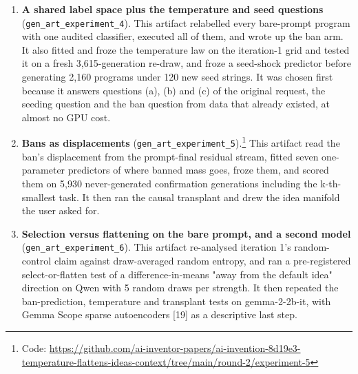 \documentclass[11pt,letterpaper]{article}
\begin{document}
\begin{enumerate}
\item \textbf{A shared label space plus the temperature and seed questions} (\texttt{gen\_\allowbreak{}art\_\allowbreak{}experiment\_\allowbreak{}4}). This artifact relabelled every bare-prompt program with one audited classifier, executed all of them, and wrote up the ban arm. It also fitted and froze the temperature law on the iteration-1 grid and tested it on a fresh 3,615-generation re-draw, and froze a seed-shock predictor before generating 2,160 programs under 120 new seed strings. It was chosen first because it answers questions (a), (b) and (c) of the original request, the seeding question and the ban question from data that already existed, at almost no GPU cost.
\item \textbf{Bans as displacements} (\texttt{gen\_\allowbreak{}art\_\allowbreak{}experiment\_\allowbreak{}5}).\footnote{Code: \url{https://github.com/ai-inventor-papers/ai-invention-8d19e3-temperature-flattens-ideas-context/tree/main/round-2/experiment-5}} This artifact read the ban's displacement from the prompt-final residual stream, fitted seven one-parameter predictors of where banned mass goes, froze them, and scored them on 5,930 never-generated confirmation generations including the k-th-smallest task. It then ran the causal transplant and drew the idea manifold the user asked for.
\item \textbf{Selection versus flattening on the bare prompt, and a second model} (\texttt{gen\_\allowbreak{}art\_\allowbreak{}experiment\_\allowbreak{}6}). This artifact re-analysed iteration 1's random-control claim against draw-averaged random entropy, and ran a pre-registered select-or-flatten test of a difference-in-means "away from the default idea" direction on Qwen with 5 random draws per strength. It then repeated the ban-prediction, temperature and transplant tests on gemma-2-2b-it, with Gemma Scope sparse autoencoders [19] as a descriptive last step.
\end{enumerate}
\end{document}
